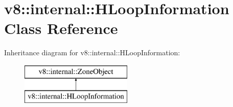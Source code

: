 \hypertarget{classv8_1_1internal_1_1_h_loop_information}{}\section{v8\+:\+:internal\+:\+:H\+Loop\+Information Class Reference}
\label{classv8_1_1internal_1_1_h_loop_information}
Inheritance diagram for v8\+:\+:internal\+:\+:H\+Loop\+Information\+:\begin{figure}[H]
\begin{center}
\leavevmode
\includegraphics[height=2.000000cm]{classv8_1_1internal_1_1_h_loop_information}
\end{center}
\end{figure}
